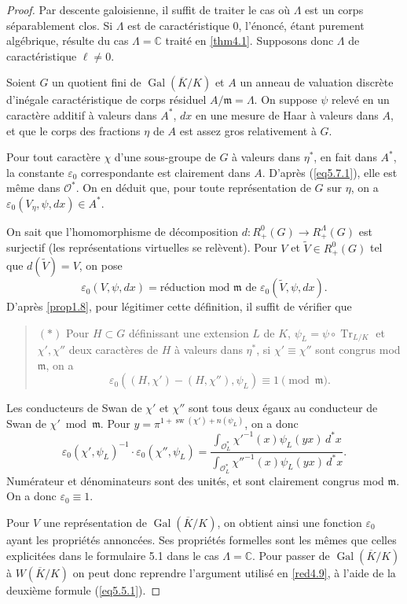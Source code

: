 \documentclass[11pt,a4paper]{amsart}
\theoremstyle{plain}
\theoremstyle{definition}
\DeclareMathOperator{\Gal}{Gal}
\DeclareMathOperator{\Tr}{Tr}
\newcommand{\dbC}{\mathbb{C}}
\DeclareMathOperator{\sw}{sw}
\newcommand{\scrO}{\mathscr{O}}
\newcommand{\ov}[1]{\overline{#1}}
\newcommand{\eps}{\varepsilon}
\begin{document}
\begin{proof}
Par descente galoisienne, il suffit de traiter le cas o\`u $\Lambda$ est un corps s\'eparablement clos. Si $\Lambda$ est de caract\'eristique $0$, l'\'enonc\'e, \'etant purement alg\'ebrique, r\'esulte du cas $\Lambda = \dbC$ trait\'e en \ref{thm4.1}. Supposons donc $\Lambda$ de caract\'eristique $\ell \not= 0$.

Soient $G$ un quotient fini de $\Gal(\ov{K}/K)$ et $A$ un anneau de valuation discr\`ete d'in\'egale caract\'eristique de corps r\'esiduel $A/\mathfrak{m} = \Lambda$. On suppose $\psi$ relev\'e en un caract\`ere additif \`a valeurs dans $A^{*}$, $dx$ en une mesure de Haar \`a valeurs dans $A$, et que le corps des fractions $\eta$ de $A$ est assez gros relativement \`a $G$.

Pour tout caract\`ere $\chi$ d'une sous-groupe de $G$ \`a valeurs dans $\eta^{*}$, en fait dans $A^{*}$, la constante $\eps_{0}$ correspondante est clairement dans $A$. D'apr\`es (\ref{eq5.7.1}), elle est m\^eme dans $\scrO^{*}$. On en d\'eduit que, pour toute repr\'esentation de $G$ sur $\eta$, on a $\eps_{0}(V_{\eta}, \psi, dx) \in A^{*}$.

On sait que l'homomorphisme de d\'ecomposition $d: R_{+}^{0}(G) \to R_{+}^{\Lambda}(G)$ est surjectif (les repr\'esentations virtuelles se rel\`event). Pour $V$ et $\tilde{V} \in R_{+}^{0}(G)$ tel que $d(\tilde{V}) = V$, on pose
\[
\eps_{0}(V,\psi,dx) = \text{r\'eduction mod } \mathfrak{m} \text{ de } \eps_{0}(\tilde{V},\psi,dx).
\]
D'apr\`es \ref{prop1.8}, pour l\'egitimer cette d\'efinition, il suffit de v\'erifier que
\begin{quote}
$(*)$ Pour $H \subset G$ d\'efinissant une extension $L$ de $K$, $\psi_{L} = \psi \circ \Tr_{L/K}$ et $\chi', \chi''$ deux caract\`eres de $H$ \`a valeurs dans $\eta^{*}$, si $\chi' \equiv \chi''$ sont congrus mod $\mathfrak{m}$, on a
\[
\eps_{0}((H,\chi') - (H,\chi''), \psi_{L}) \equiv 1 \pmod{\mathfrak{m}}.
\]
\end{quote}
Les conducteurs de Swan de $\chi'$ et $\chi''$ sont tous deux \'egaux au conducteur de Swan de $\chi' \bmod \mathfrak{m}$. Pour $y = \pi^{1+\sw(\chi')+n(\psi_{L})}$, on a donc
\[
\eps_{0}(\chi',\psi_{L})^{-1} \cdot \eps_{0}(\chi'',\psi_{L}) = \frac{\int_{\scrO_{L}^{*}} \chi'^{-1}(x) \psi_{L}(yx)\, d^{*}x}{\int_{\scrO_{L}^{*}} \chi''^{-1}(x) \psi_{L}(yx)\, d^{*}x}.
\]
Num\'erateur et d\'enominateurs sont des unit\'es, et sont clairement congrus mod $\mathfrak{m}$. On a donc $\eps_{0} \equiv 1$.

Pour $V$ une repr\'esentation de $\Gal(\ov{K}/K)$, on obtient ainsi une fonction $\eps_{0}$ ayant les propri\'et\'es annonc\'ees. Ses propri\'et\'es formelles sont les m\^emes que celles explicit\'ees dans le formulaire 5.1 dans le cas $\Lambda = \dbC$. Pour passer de $\Gal(\ov{K}/K)$ \`a $W(\ov{K}/K)$ on peut donc reprendre l'argument utilis\'e en \ref{red4.9}, \`a l'aide de la deuxi\`eme formule (\ref{eq5.5.1}).
\end{proof}
\end{document}
